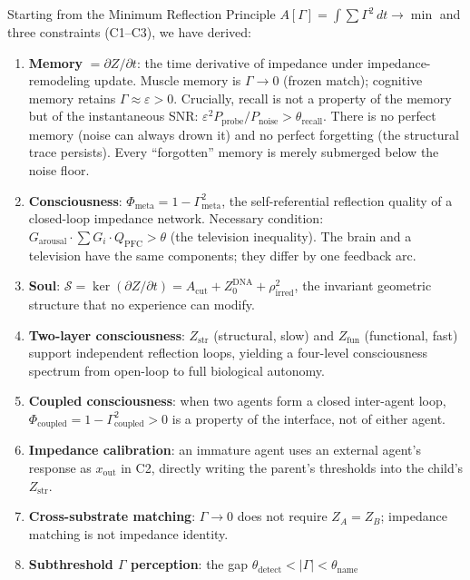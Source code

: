 \documentclass[aps,pre,twocolumn,superscriptaddress,floatfix]{revtex4-2}
\newcommand{\Gmeta}{\Gamma_{\text{meta}}}
\newcommand{\Phimeta}{\Phi_{\text{meta}}}
\newcommand{\Zarousal}{G_{\text{arousal}}}
\newcommand{\QPFC}{Q_{\text{PFC}}}
\newcommand{\Acut}{A_{\text{cut}}}
\begin{document}
Starting from the Minimum Reflection Principle
$A[\Gamma]=\int\sum\Gamma^2\,dt\to\min$ and three
constraints (C1--C3), we have derived:

\begin{enumerate}
  \item \textbf{Memory} $=\partial Z/\partial t$:
    the time derivative of impedance under impedance-remodeling update.
    Muscle memory is $\Gamma\to 0$ (frozen match);
    cognitive memory retains $\Gamma\approx\varepsilon>0$.
    Crucially, recall is not a property of the memory
    but of the instantaneous SNR:
    $\varepsilon^2 P_{\text{probe}} / P_{\text{noise}} >
    \theta_{\text{recall}}$.
    There is no perfect memory (noise can always drown it)
    and no perfect forgetting (the structural trace persists).
    Every ``forgotten'' memory is merely submerged below
    the noise floor.
  \item \textbf{Consciousness}:
    $\Phimeta=1-\Gmeta^2$, the self-referential reflection
    quality of a closed-loop impedance network.
    Necessary condition:
    $\Zarousal\cdot\sum G_i\cdot\QPFC>\theta$
    (the television inequality).
    The brain and a television have the same components;
    they differ by one feedback arc.
  \item \textbf{Soul}:
    $\mathcal{S}=\ker(\partial Z/\partial t)=\Acut+Z_0^{\text{DNA}}+\rho_{\text{irred}}^2$,
    the invariant geometric structure that no experience can
    modify.
  \item \textbf{Two-layer consciousness}:
    $Z_{\text{str}}$ (structural, slow) and
    $Z_{\text{fun}}$ (functional, fast) support
    independent reflection loops, yielding a four-level
    consciousness spectrum from open-loop to full
    biological autonomy.
  \item \textbf{Coupled consciousness}:
    when two agents form a closed inter-agent loop,
    $\Phi_{\text{coupled}}=1-\Gamma_{\text{coupled}}^2>0$
    is a property of the interface, not of either agent.
  \item \textbf{Impedance calibration}:
    an immature agent uses an external agent's response
    as $x_{\text{out}}$ in C2, directly writing the
    parent's thresholds into the child's
    $Z_{\text{str}}$.
  \item \textbf{Cross-substrate matching}:
    $\Gamma\to 0$ does not require $Z_A=Z_B$;
    impedance matching is not impedance identity.
  \item \textbf{Subthreshold $\Gamma$ perception}:
    the gap $\theta_{\text{detect}}<|\Gamma|<\theta_{\text{name}}$

\end{enumerate}
\end{document}
